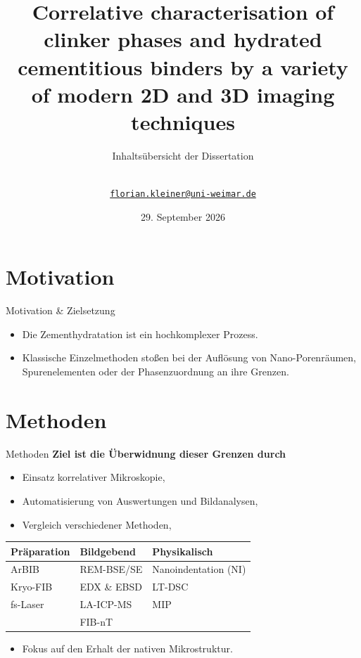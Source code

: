 \documentclass[10pt,aspectratio=169]{beamer}
\title[Dissertation]
{Correlative characterisation of clinker phases and hydrated cementitious binders by a variety of modern 2D and 3D imaging techniques}
\subtitle{Inhaltsübersicht der Dissertation}
\date{29. September 2026}
\author[\shortauthor]{
  \shortauthor\,\orcidlink{\orcid}\\
  \href{mailto:florian.kleiner@uni-weimar.de}{{\tt florian.kleiner@uni-weimar.de}}
}
\institute[Bauhaus-Universität Weimar]{
  Bauhaus-Universität Weimar\\
  Fak. B\&U\\
  Prof. Werkstoffe des Bauens
}
\begin{document}
{\BUWtitlebg
\begin{frame}
  \titlepage

\end{frame}}


\section{Motivation}
\begin{frame}{Motivation \& Zielsetzung}
  \begin{itemize}
    \item Die Zementhydratation ist ein hochkomplexer Prozess.
    \item Klassische Einzelmethoden stoßen bei der Auflösung von Nano-Porenräumen, Spurenelementen oder der Phasenzuordnung an ihre Grenzen.
  \end{itemize}
  
  \begin{center}
  \end{center}
\end{frame}

\section{Methoden}
\begin{frame}{Methoden}
  \textbf{Ziel ist die Überwidnung dieser Grenzen durch}
  \begin{itemize}
    \item Einsatz korrelativer Mikroskopie,
    \item Automatisierung von Auswertungen und Bildanalysen,
    \item Vergleich verschiedener Methoden,
  \end{itemize}
  \begin{center}
    \begin{tabular}{lll}
      \toprule
      \textbf{Präparation} & \textbf{Bildgebend} & \textbf{Physikalisch} \\
      \midrule
      ArBIB & REM-BSE/SE & Nanoindentation (NI) \\
      Kryo-FIB & EDX \& EBSD & LT-DSC \\
      fs-Laser & LA-ICP-MS & MIP \\
       & FIB-nT & \\
      \bottomrule
    \end{tabular}
  \end{center}
  \begin{itemize}
    \item Fokus auf den Erhalt der nativen Mikrostruktur.
  \end{itemize}
\end{frame}
\end{document}
